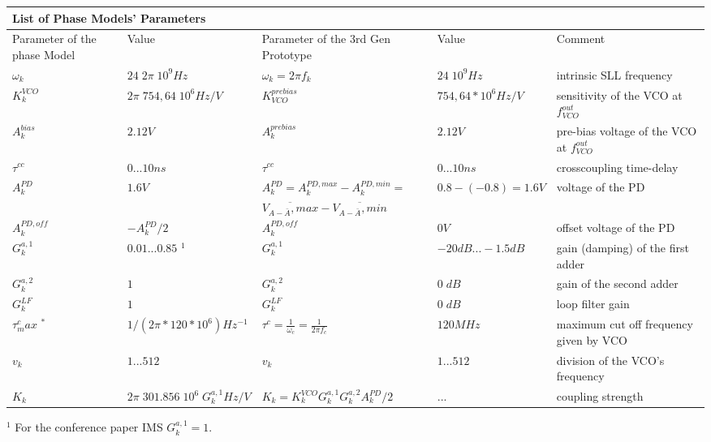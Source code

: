 \documentclass{article}
\begin{document}

\begin{flushleft}
\begin{tabular}{ |p{1.5cm}||p{3.9cm}|p{4.5cm}|p{3.5cm}|p{3cm}|  }
 \hline
 \multicolumn{5}{|l|}{List of Phase Models' Parameters} \\
 \hline
 Parameter of the phase Model & Value & Parameter of the 3rd Gen Prototype & Value & Comment\\
 \hline
 $\omega_k$   & $24\;2\pi\;10^9 Hz$    & $\omega_k=2\pi f_k$ &  $24\;10^9 Hz$ & intrinsic SLL frequency\\
\hline
 $K_k^{VCO}$   & $2\pi \; 754,64\;10^{6}Hz/V$    & $K_{VCO}^{prebias}$ &  $754,64*10^{6}Hz/V$ & sensitivity of the VCO at $f_{VCO}^{out}$\\
\hline
 $A_k^{bias}$   & $2.12V$    & $A_k^{prebias}$ &  $2.12V$ & pre-bias voltage of the VCO at $f_{VCO}^{out}$\\
\hline
 $\tau^{cc}$   & $0...10 ns$   & $\tau^{cc}$ &  $0...10 ns$ & crosscoupling time-delay\\
\hline
 $A_k^{PD}$   & $1.6V$    & ${\scriptstyle A_k^{PD}=A_k^{PD,max}-A_k^{PD,min}=}$ &  $0.8-(-0.8)=1.6V$ & voltage of the PD\\
 & & ${\scriptstyle \overline{V_{A-\bar{A}},max}-\overline{V_{A-\bar{A}},min}}$ & & \\ 
\hline
$A_k^{PD,off}$   & $-A_k^{PD}/2$    & $A_k^{PD,off}$ &  $0V$ & offset voltage of the PD\\
\hline
 $G_k^{a,1}$   & $0.01...0.85$ $^1$    & $G_k^{a,1}$ &  $-20dB...-1.5dB$ & gain (damping) of the first adder\\
\hline
 $G_k^{a,2}$   & $1$    & $G_k^{a,2}$ &  $0\;dB$ & gain of the second adder\\
 \hline
$G_k^{LF}$   & $1$    & $G_k^{LF}$ &  $0\;dB$ & loop filter gain\\
\hline
$\tau^c_max$ $^*$   & $1/(2\pi*120*10^6) Hz^{-1}$    & $\tau^c=\frac{1}{\omega_c}=\frac{1}{2\pi f_c}$ &  $120MHz$ & maximum cut off frequency given by VCO\\
 \hline
$v_k$    & $1...512$    & $v_k$ &  $1...512$ & division of the VCO's frequency\\
 \hline
$K_k$   & $2\pi \;301.856\;10^6\;G_k^{a,1} Hz/V$    & $K_k=K_k^{VCO}G_k^{a,1}G_k^{a,2}A_k^{PD}/2$ &  ... & coupling strength\\
 \hline
\end{tabular}

\end{flushleft}

$^1$ {\footnotesize For the conference paper IMS $G_k^{a,1}=1$.}



\end{document}
